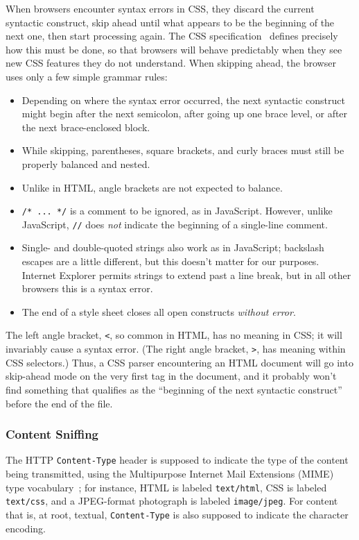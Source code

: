 \documentclass{acm_proc_article-sp}
\begin{document}
When browsers encounter syntax errors in CSS, they discard the current
syntactic construct, skip ahead until what appears to be the beginning
of the next one, then start processing again.  The CSS
specification~\cite{syndata} defines precisely how this must be done,
so that browsers will behave predictably when they see new CSS
features they do not understand.  When skipping ahead, the browser
uses only a few simple grammar rules:

\begin{itemize}
\item Depending on where the syntax error occurred, the next syntactic
  construct might begin after the next semicolon, after going up one
  brace level, or after the next brace-enclosed block.
\item While skipping, parentheses, square brackets, and curly braces
  must still be properly balanced and nested.
\item Unlike in HTML, angle brackets are not expected to balance.
\item \verb|/* ... */| is a comment to be ignored, as in JavaScript.
  However, unlike JavaScript, \verb|//| does \emph{not} indicate the
  beginning of a single-line comment.
\item Single- and double-quoted strings also work as in JavaScript;
  backslash escapes are a little different, but this doesn't matter
  for our purposes.  Internet Explorer permits strings to extend past
  a line break, but in all other browsers this is a syntax error.
\item The end of a style sheet closes all open constructs
  \emph{without error}.
\end{itemize}

The left angle bracket, \texttt{<}, so common in HTML, has no meaning
in CSS; it will invariably cause a syntax error.  (The right angle
bracket, \texttt{>}, has meaning within CSS selectors.)  Thus, a CSS
parser encountering an HTML document will go into skip-ahead mode on
the very first tag in the document, and it probably won't find
something that qualifies as the “beginning of the next syntactic
construct” before the end of the file.

\subsubsection{Content Sniffing} \label{sec:mime}
The HTTP \texttt{Content-Type} header is supposed to indicate the type
of the content being transmitted, using the Multipurpose Internet Mail
Extensions (MIME) type vocabulary~\cite{mime}; for instance, HTML is
labeled \texttt{text/html}, CSS is labeled \texttt{text/css}, and a
JPEG-format photograph is labeled \texttt{image/jpeg}.  For content
that is, at root, textual, \texttt{Content-Type} is also supposed to
indicate the character encoding.
\end{document}
